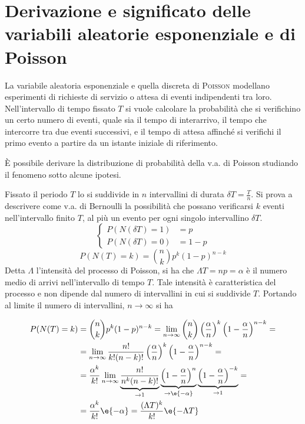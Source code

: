 \section{Derivazione e significato delle variabili aleatorie esponenziale e di Poisson}
La variabile aleatoria esponenziale e quella discreta di \textsc{Poisson} modellano esperimenti di richieste di servizio o attesa di eventi indipendenti tra loro. Nell'intervallo di tempo fissato $T$ si vuole calcolare la probabilità che si verifichino un certo numero di eventi, quale sia il tempo di interarrivo, il tempo che intercorre tra due eventi successivi, e il tempo di attesa affinché si verifichi il primo evento a partire da un istante iniziale di riferimento.

\`E possibile derivare la distribuzione di probabilità della v.a. di Poisson studiando il fenomeno sotto alcune ipotesi.

Fissato il periodo $T$ lo si suddivide in $n$ intervallini di durata $\delta T=\frac{T}{n}$. Si prova a descrivere come v.a. di Bernoulli la possibilità che possano verificarsi $k$ eventi nell'intervallo finito $T$, al più un evento per ogni singolo intervallino $\delta T$.
\begin{equation}
\begin{cases}
	P(N(\delta T)=1)&=p\\
	P(N(\delta T)=0)&=1-p
\end{cases}
\end{equation}
\begin{equation}
	P(N(T)=k)=\binom{n}{k}p^k(1-p)^{n-k}
\end{equation}
Detta $\Lambda$ l'intensità del processo di Poisson, si ha che $\Lambda T=n p=\alpha$ è il numero medio di arrivi nell'intervallo di tempo $T$. Tale intensità è caratteristica del processo e non dipende dal numero di intervallini in cui si suddivide $T$. Portando al limite il numero di intervallini, $n\to\infty$ si ha

\begin{equation}
\begin{split}
	P(N(T)=k)&=\binom{n}{k}p^k(1-p)^{n-k}=\lim\limits_{n\to\infty}\binom{n}{k}\left(\frac{\alpha}{n}\right)^k\left(1-\frac{\alpha}{n}\right)^{n-k}=\\
	&=\lim\limits_{n\to\infty}\frac{n!}{k!(n-k)!}\left(\frac{\alpha}{n}\right)^k\left(1-\frac{\alpha}{n}\right)^{n-k}=\\
	&=\frac{\alpha^k}{k!}\lim\limits_{n\to\infty}\underbrace{\frac{n!}{n^k(n-k)!}}_{\to 1}\underbrace{\left(1-\frac{\alpha}{n}\right)^n}_{\to\e{-\alpha}} \underbrace{\left(1-\frac{\alpha}{n}\right)^{-k}}_{\to 1}=\\
	&=\frac{\alpha^k}{k!}\e{-\alpha}=\frac{(\Lambda T)^k}{k!}\e{-\Lambda T}
	\end{split}
\end{equation}

